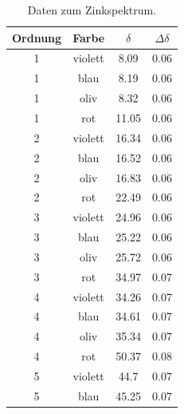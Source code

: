 \documentclass[]{article}
\begin{document}
\begin{table}[h]
\centering
\begin{tabular}{|c|c|c|c|}
\hline
Ordnung & Farbe & $\delta$ & $\Delta\delta$ \\ \hline\hline
1 & violett & 8.09 & 0.06 \\ \hline
1 & blau & 8.19 & 0.06 \\ \hline
1 & oliv & 8.32 & 0.06 \\ \hline
1 & rot & 11.05 & 0.06 \\ \hline
2 & violett & 16.34 & 0.06 \\ \hline
2 & blau & 16.52 & 0.06 \\ \hline
2 & oliv & 16.83 & 0.06 \\ \hline
2 & rot & 22.49 & 0.06 \\ \hline
3 & violett & 24.96 & 0.06 \\ \hline
3 & blau & 25.22 & 0.06 \\ \hline
3 & oliv & 25.72 & 0.06 \\ \hline
3 & rot & 34.97 & 0.07 \\ \hline
4 & violett & 34.26 & 0.07 \\ \hline
4 & blau & 34.61 & 0.07 \\ \hline
4 & oliv & 35.34 & 0.07 \\ \hline
4 & rot & 50.37 & 0.08 \\ \hline
5 & violett & 44.7 & 0.07 \\ \hline
5 & blau & 45.25 & 0.07 \\ \hline
\hline
\end{tabular}
\caption{Daten zum Zinkspektrum.\label{Zn Data}}
\end{table}
\end{document}
